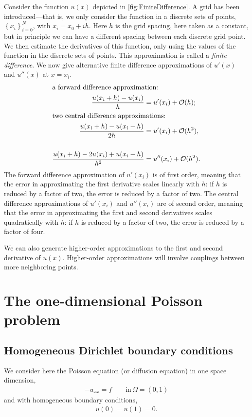 Consider the function $u(x)$ depicted in \autoref{fig:FiniteDifference}. A grid
has been introduced---that is, we only consider the function in a discrete sets
of points, $\left\{x_i\right\}_{i=0}^N$, with $x_i = x_0+ih$. Here $h$ is the
grid spacing, here taken as a constant, but in principle we can have a different
spacing between each discrete grid point. We then estimate the derivatives of
this function, only using the values of the function in the discrete sets of
points. This approximation is called a \emph{finite difference}. We now give
alternative finite difference approximations of $u'(x)$ and $u''(x)$ at $x=x_i$.
\begin{align*}
  \intertext{a forward difference approximation:}
  \frac{u(x_i+h)-u(x_i)}{h} &= u'(x_i) + \mathcal{O}(h); \\
  \intertext{two central difference approximations:}
  \frac{u(x_i+h)-u(x_i-h)}{2 h} &= u'(x_i) + \mathcal{O}(h^2), \\ \\
  \frac{u(x_i+h)-2 u(x_i)+u(x_i-h)}{h^2} &= u''(x_i) + \mathcal{O}(h^2).
\end{align*}
The forward difference approximation of $u'(x_i)$ is of first order, meaning
that the error in approximating the first derivative scales linearly with $h$:
if $h$ is reduced by a factor of two, the error is reduced by a factor of two.
The central difference approximations of $u'(x_i)$ and $u''(x_i)$ are of second
order, meaning that the error in approximating the first and second derivatives
scales quadratically with $h$: if $h$ is reduced by a factor of two, the error
is reduced by a factor of four.

We can also generate higher-order approximations to the first and second
derivative of $u(x)$. Higher-order approximations will involve couplings between
more neighboring points.

\section{The one-dimensional Poisson problem}

\subsection{Homogeneous Dirichlet boundary conditions}

We consider here the Poisson equation (or diffusion equation) in one space
dimension,
\begin{align*}
  -u_{xx} = f \qquad \text{in}\,\Omega=(0,1)
\end{align*}
and with homogeneous boundary conditions,
\begin{align*}
  u(0) = u(1) = 0.
\end{align*}

